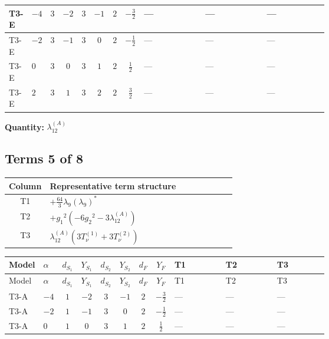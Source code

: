 \documentclass[8pt]{article}
\begin{document}
\begin{landscape}
\begin{longtable}{@{}llcccccc >{\raggedright\arraybackslash}p{0.21\linewidth} >{\raggedright\arraybackslash}p{0.21\linewidth} >{\raggedright\arraybackslash}p{0.21\linewidth}@{}}
T3-E & $-4$ & $3$ & $-2$ & $3$ & $-1$ & $2$ & $-\frac{3}{2}$ & --- & --- & --- \\
\midrule
T3-E & $-2$ & $3$ & $-1$ & $3$ & $0$ & $2$ & $-\frac{1}{2}$ & --- & --- & --- \\
\midrule
T3-E & $0$ & $3$ & $0$ & $3$ & $1$ & $2$ & $\frac{1}{2}$ & --- & --- & --- \\
\midrule
T3-E & $2$ & $3$ & $1$ & $3$ & $2$ & $2$ & $\frac{3}{2}$ & --- & --- & --- \\
\midrule
\bottomrule
\end{longtable}
\clearpage
\noindent\textbf{Quantity: }$\lambda_{12}^{(A)}$\par\smallskip
\subsection*{Terms 5 of 8}
\begin{center}
\begin{tabular}{@{}c >{\raggedright\arraybackslash}p{0.82\linewidth}@{}}
\toprule
Column & Representative term structure \\
\midrule
T1 & \(\displaystyle +\frac{64}{3} {\lambda_{9}} \left({\lambda_{9}}\right)^{*}\) \\
\midrule
T2 & \(\displaystyle +{g_1}^2 \left(-6 {g_2}^2-3 {\lambda_{12}^{(A)}}\right)\) \\
\midrule
T3 & \(\displaystyle {\lambda_{12}^{(A)}} (3 T_{\nu}^{(1)}+3 T_{\nu}^{(2)})\) \\
\midrule
\bottomrule
\end{tabular}
\end{center}
\smallskip
\tiny
\begin{longtable}{@{}llcccccc >{\raggedright\arraybackslash}p{0.21\linewidth} >{\raggedright\arraybackslash}p{0.21\linewidth} >{\raggedright\arraybackslash}p{0.21\linewidth}@{}}
\toprule
Model & $\alpha$ & $d_{S_1}$ & $Y_{S_1}$ & $d_{S_2}$ & $Y_{S_2}$ & $d_F$ & $Y_F$ & T1 & T2 & T3 \\
\midrule
\endfirsthead
\toprule
Model & $\alpha$ & $d_{S_1}$ & $Y_{S_1}$ & $d_{S_2}$ & $Y_{S_2}$ & $d_F$ & $Y_F$ & T1 & T2 & T3 \\
\midrule
\endhead
T3-A & $-4$ & $1$ & $-2$ & $3$ & $-1$ & $2$ & $-\frac{3}{2}$ & --- & --- & --- \\
\midrule
T3-A & $-2$ & $1$ & $-1$ & $3$ & $0$ & $2$ & $-\frac{1}{2}$ & --- & --- & --- \\
\midrule
T3-A & $0$ & $1$ & $0$ & $3$ & $1$ & $2$ & $\frac{1}{2}$ & --- & --- & --- \\

\end{longtable}
\end{landscape}
\end{document}
